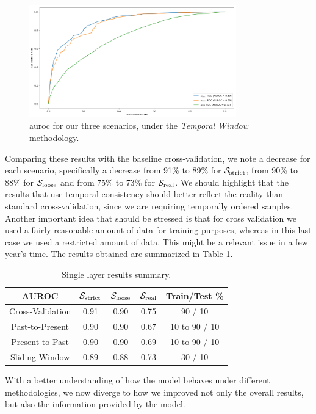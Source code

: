 \begin{figure}[!h]
	\centering
	\includegraphics[width=0.8\textwidth]{Figures/slidingwindow.png}
	\caption[Single layer results for static features in \textit{Temporal Window}.]{\gls{auroc} for our three scenarios, under the \textit{Temporal Window} methodology.}
	\label{fig:slidingwindow}
\end{figure}

\medskip

Comparing these results with the baseline cross-validation, we note a decrease for each scenario, specifically a decrease from 91\% to 89\% for $\mathcal{S}_{\mathrm{strict}}$, from 90\% to 88\% for $\mathcal{S}_{\mathrm{loose}}$ and from 75\% to 73\% for $\mathcal{S}_{\mathrm{real}}$.
We should highlight that the results that use temporal consistency should better reflect the reality than standard cross-validation, since we are requiring temporally ordered samples.
Another important idea that should be stressed is that for cross validation we used a fairly reasonable amount of data for training purposes, whereas in this last case we used a restricted amount of data. This might be a relevant issue in a few year's time. The results obtained are summarized in Table \ref{tab:singlelayer_results}.

\begin{table}[!htb]
	\renewcommand{\arraystretch}{1.0} %
	\centering
	\begin{tabular}{ccccc}
		\toprule
		AUROC & $\mathcal{S}_{\mathrm{strict}}$ & $\mathcal{S}_{\mathrm{loose}}$ & $\mathcal{S}_{\mathrm{real}}$ & Train/Test \%\\
		\midrule
		Cross-Validation & 0.91 & 0.90 & 0.75 & 90 / 10\\
		Past-to-Present & 0.90 & 0.90 & 0.67 & 10 to 90 / 10\\
		Present-to-Past & 0.90 & 0.90 & 0.69 & 10 to 90 / 10\\
		Sliding-Window & 0.89 & 0.88 & 0.73 & 30 / 10\\
		\bottomrule
\end{tabular}
\caption{Single layer results summary.}
\label{tab:singlelayer_results}
\end{table}

With a better understanding of how the model behaves under different methodologies, we now diverge to how we improved not only the overall results, but also the information provided by the model.
